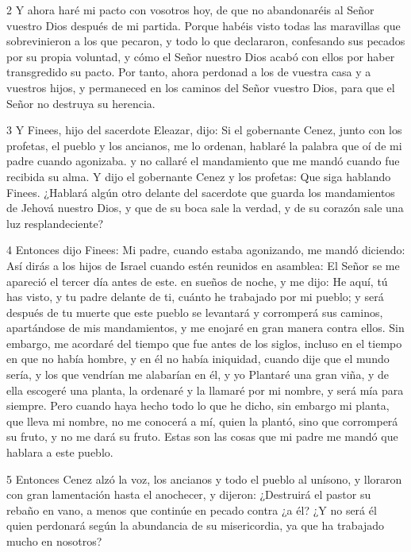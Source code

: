 \par 2 Y ahora haré mi pacto con vosotros hoy, de que no abandonaréis al Señor vuestro Dios después de mi partida. Porque habéis visto todas las maravillas que sobrevinieron a los que pecaron, y todo lo que declararon, confesando sus pecados por su propia voluntad, y cómo el Señor nuestro Dios acabó con ellos por haber transgredido su pacto. Por tanto, ahora perdonad a los de vuestra casa y a vuestros hijos, y permaneced en los caminos del Señor vuestro Dios, para que el Señor no destruya su herencia.

\par 3 Y Finees, hijo del sacerdote Eleazar, dijo: Si el gobernante Cenez, junto con los profetas, el pueblo y los ancianos, me lo ordenan, hablaré la palabra que oí de mi padre cuando agonizaba. y no callaré el mandamiento que me mandó cuando fue recibida su alma. Y dijo el gobernante Cenez y los profetas: Que siga hablando Finees. ¿Hablará algún otro delante del sacerdote que guarda los mandamientos de Jehová nuestro Dios, y que de su boca sale la verdad, y de su corazón sale una luz resplandeciente?

\par 4 Entonces dijo Finees: Mi padre, cuando estaba agonizando, me mandó diciendo: Así dirás a los hijos de Israel cuando estén reunidos en asamblea: El Señor se me apareció el tercer día antes de este. en sueños de noche, y me dijo: He aquí, tú has visto, y tu padre delante de ti, cuánto he trabajado por mi pueblo; y será después de tu muerte que este pueblo se levantará y corromperá sus caminos, apartándose de mis mandamientos, y me enojaré en gran manera contra ellos. Sin embargo, me acordaré del tiempo que fue antes de los siglos, incluso en el tiempo en que no había hombre, y en él no había iniquidad, cuando dije que el mundo sería, y los que vendrían me alabarían en él, y yo Plantaré una gran viña, y de ella escogeré una planta, la ordenaré y la llamaré por mi nombre, y será mía para siempre. Pero cuando haya hecho todo lo que he dicho, sin embargo mi planta, que lleva mi nombre, no me conocerá a mí, quien la plantó, sino que corromperá su fruto, y no me dará su fruto. Estas son las cosas que mi padre me mandó que hablara a este pueblo.

\par 5 Entonces Cenez alzó la voz, los ancianos y todo el pueblo al unísono, y lloraron con gran lamentación hasta el anochecer, y dijeron: ¿Destruirá el pastor su rebaño en vano, a menos que continúe en pecado contra ¿a él? ¿Y no será él quien perdonará según la abundancia de su misericordia, ya que ha trabajado mucho en nosotros?

